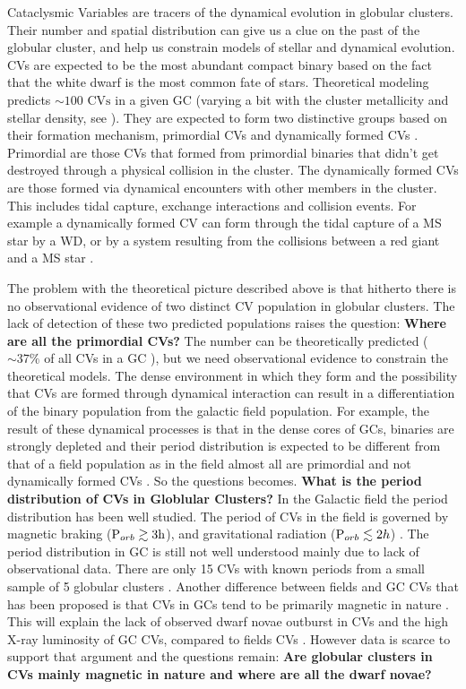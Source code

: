 Cataclysmic Variables are tracers of the dynamical evolution in globular clusters. Their number and spatial distribution can give us a clue on the past of the globular cluster, and help us constrain models of stellar and dynamical evolution. CVs are expected to be the most abundant compact binary based on the fact that the white dwarf is the most common fate of stars. Theoretical modeling predicts $\sim 100 \text{ CVs}$ in a given GC (varying a bit with the cluster metallicity and stellar density, see \citealp{ivanova_formation_2006}). They are expected to form two distinctive groups based on their formation mechanism, primordial CVs and dynamically formed CVs \citep[e.g.][]{hut_binaries_1992}. Primordial are those CVs that formed from primordial binaries that didn't get destroyed through a physical collision in the cluster. The dynamically formed CVs are those formed via dynamical encounters with other members in the cluster. This includes tidal capture, exchange interactions and collision events. For example a dynamically formed CV can form through the tidal capture of a MS star by a WD, or by a system resulting from the collisions between a red giant and a MS star \citep{ivanova_formation_2006}. 

The problem with the theoretical picture described above is that hitherto there is no observational evidence of two distinct CV population in globular clusters. The lack of detection of these two predicted populations raises the question: \textbf{Where are all the primordial CVs?} The number can be theoretically predicted ($\sim 37 \%$ of all CVs in a GC \citep{ivanova_formation_2006}), but we need observational evidence to constrain the theoretical models. The dense environment in which they form and the possibility that CVs are formed through dynamical interaction can result in a differentiation of the binary population from the galactic field population. For example, the result of these dynamical processes is that in the dense cores of GCs, binaries are strongly depleted and their period distribution is expected to be different from that of a field population as in the field almost all are primordial and not dynamically formed CVs \citep{ivanova_evolution_2005}. So the questions becomes. \textbf{What is the period distribution of CVs in Globlular Clusters?} In the Galactic field the period distribution has been well studied. The period of CVs in the field is governed by magnetic braking ($\text P _{orb} \gtrsim  3 \text h$), and gravitational radiation ($\text P _{orb} \lesssim 2 h$) \citep{Robinson_period_1983}. The period distribution in GC is still not well understood mainly due to lack of observational data. There are only 15 CVs with known periods from a small sample of 5 globular clusters \citep{knigge_cataclysmic_2012}. Another difference between fields and GC CVs that has been proposed is that CVs in GCs tend to be primarily magnetic in nature \citep{grindlay_magnetic_1999}. This will explain the lack of observed dwarf novae outburst in CVs \citep{shara_CVsDN_1996} and the high X-ray luminosity of GC CVs, compared to fields CVs \citep{verbunt_cataclysmic_1997}. However data is scarce to support that argument and the questions remain: \textbf{Are globular clusters in CVs mainly magnetic in nature and where are all the dwarf novae?} 

